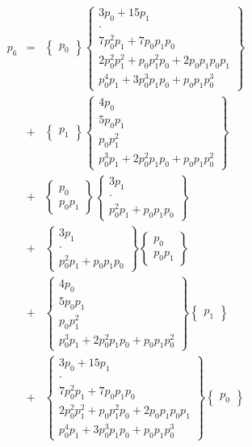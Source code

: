 \documentclass[a4paper,12pt]{article}
\numberwithin{definition}{section}
\numberwithin{lemma}{section}
\numberwithin{proposition}{section}
\numberwithin{theorem}{section}
\numberwithin{grammar}{section}
\numberwithin{program}{section}
\numberwithin{convention}{section}
\numberwithin{corollary}{section}
\numberwithin{principle}{section}
\begin{document}
$$\begin{array}{lcl}
p_6 & = & \begin{Bmatrix} p_0 \end{Bmatrix} \begin{Bmatrix} 3 p_0 + 15 p_1 \\ \cdot \\ 7 p_0^2 p_1 + 7 p_0 p_1 p_0 \\ 2 p_0^2 p_1^2 + p_0 p_1^2 p_0 + 2 p_0 p_1 p_0 p_1 \\ p_0^4 p_1 + 3 p_0^3 p_1 p_0 + p_0 p_1 p_0^3 \end{Bmatrix} \\
    & + & \begin{Bmatrix} p_1 \end{Bmatrix} \begin{Bmatrix} 4 p_0 \\ 5 p_0 p_1 \\ p_0 p_1^2 \\ p_0^3 p_1 + 2 p_0^2 p_1 p_0 + p_0 p_1 p_0^2 \end{Bmatrix} \\
    & + & \begin{Bmatrix} p_0 \\  p_0 p_1 \end{Bmatrix} \begin{Bmatrix} 3 p_1 \\ \cdot \\ p_0^2 p_1 + p_0 p_1 p_0 \end{Bmatrix}  \\
    & + & \begin{Bmatrix} 3 p_1 \\ \cdot \\ p_0^2 p_1 + p_0 p_1 p_0 \end{Bmatrix} \begin{Bmatrix} p_0 \\  p_0 p_1 \end{Bmatrix} \\
    & + & \begin{Bmatrix} 4 p_0 \\ 5 p_0 p_1 \\ p_0 p_1^2 \\ p_0^3 p_1 + 2 p_0^2 p_1 p_0 + p_0 p_1 p_0^2 \end{Bmatrix} \begin{Bmatrix} p_1 \end{Bmatrix} \\
    & + & \begin{Bmatrix} 3 p_0 + 15 p_1 \\ \cdot \\ 7 p_0^2 p_1 + 7 p_0 p_1 p_0 \\ 2 p_0^2 p_1^2 + p_0 p_1^2 p_0 + 2 p_0 p_1 p_0 p_1 \\ p_0^4 p_1 + 3 p_0^3 p_1 p_0 + p_0 p_1 p_0^3 \end{Bmatrix}\begin{Bmatrix} p_0 \end{Bmatrix}\\
\end{array}$$
\end{document}
